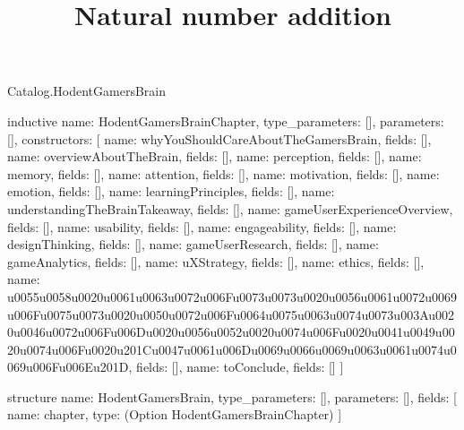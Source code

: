 \begin{lexlean}{Catalog.HodentGamersBrain}
\title{Natural number addition}
\begin{semanticmodule}
inductive{
  name: HodentGamersBrainChapter,
  type_parameters: [],
  parameters: [],
  constructors: [
    {name: whyYouShouldCareAboutTheGamersBrain, fields: []},
    {name: overviewAboutTheBrain, fields: []},
    {name: perception, fields: []},
    {name: memory, fields: []},
    {name: attention, fields: []},
    {name: motivation, fields: []},
    {name: emotion, fields: []},
    {name: learningPrinciples, fields: []},
    {name: understandingTheBrainTakeaway, fields: []},
    {name: gameUserExperienceOverview, fields: []},
    {name: usability, fields: []},
    {name: engageability, fields: []},
    {name: designThinking, fields: []},
    {name: gameUserResearch, fields: []},
    {name: gameAnalytics, fields: []},
    {name: uXStrategy, fields: []},
    {name: ethics, fields: []},
    {name: u0055u0058u0020u0061u0063u0072u006Fu0073u0073u0020u0056u0061u0072u0069u006Fu0075u0073u0020u0050u0072u006Fu0064u0075u0063u0074u0073u003Au0020u0046u0072u006Fu006Du0020u0056u0052u0020u0074u006Fu0020u0041u0049u0020u0074u006Fu0020u201Cu0047u0061u006Du0069u0066u0069u0063u0061u0074u0069u006Fu006Eu201D, fields: []},
    {name: toConclude, fields: []}
  ]
}

structure{
  name: HodentGamersBrain,
  type_parameters: [],
  parameters: [],
  fields: [
    {name: chapter, type: (Option HodentGamersBrainChapter)}
  ]
}
\end{semanticmodule}
\end{lexlean}
